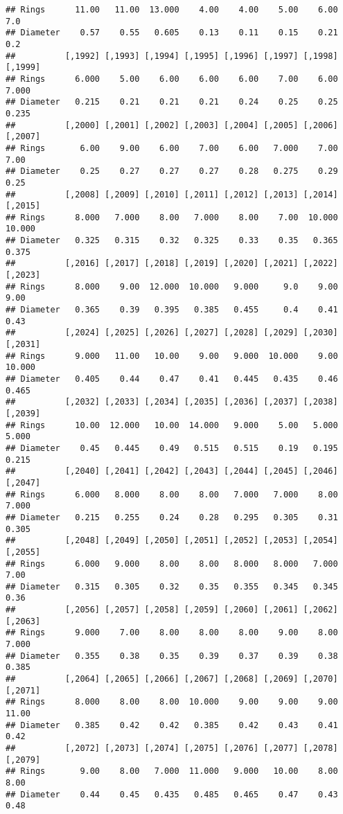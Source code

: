 \documentclass[
]{article}
\begin{document}
\begin{verbatim}
## Rings      11.00   11.00  13.000    4.00    4.00    5.00    6.00     7.0
## Diameter    0.57    0.55   0.605    0.13    0.11    0.15    0.21     0.2
##          [,1992] [,1993] [,1994] [,1995] [,1996] [,1997] [,1998] [,1999]
## Rings      6.000    5.00    6.00    6.00    6.00    7.00    6.00   7.000
## Diameter   0.215    0.21    0.21    0.21    0.24    0.25    0.25   0.235
##          [,2000] [,2001] [,2002] [,2003] [,2004] [,2005] [,2006] [,2007]
## Rings       6.00    9.00    6.00    7.00    6.00   7.000    7.00    7.00
## Diameter    0.25    0.27    0.27    0.27    0.28   0.275    0.29    0.25
##          [,2008] [,2009] [,2010] [,2011] [,2012] [,2013] [,2014] [,2015]
## Rings      8.000   7.000    8.00   7.000    8.00    7.00  10.000  10.000
## Diameter   0.325   0.315    0.32   0.325    0.33    0.35   0.365   0.375
##          [,2016] [,2017] [,2018] [,2019] [,2020] [,2021] [,2022] [,2023]
## Rings      8.000    9.00  12.000  10.000   9.000     9.0    9.00    9.00
## Diameter   0.365    0.39   0.395   0.385   0.455     0.4    0.41    0.43
##          [,2024] [,2025] [,2026] [,2027] [,2028] [,2029] [,2030] [,2031]
## Rings      9.000   11.00   10.00    9.00   9.000  10.000    9.00  10.000
## Diameter   0.405    0.44    0.47    0.41   0.445   0.435    0.46   0.465
##          [,2032] [,2033] [,2034] [,2035] [,2036] [,2037] [,2038] [,2039]
## Rings      10.00  12.000   10.00  14.000   9.000    5.00   5.000   5.000
## Diameter    0.45   0.445    0.49   0.515   0.515    0.19   0.195   0.215
##          [,2040] [,2041] [,2042] [,2043] [,2044] [,2045] [,2046] [,2047]
## Rings      6.000   8.000    8.00    8.00   7.000   7.000    8.00   7.000
## Diameter   0.215   0.255    0.24    0.28   0.295   0.305    0.31   0.305
##          [,2048] [,2049] [,2050] [,2051] [,2052] [,2053] [,2054] [,2055]
## Rings      6.000   9.000    8.00    8.00   8.000   8.000   7.000    7.00
## Diameter   0.315   0.305    0.32    0.35   0.355   0.345   0.345    0.36
##          [,2056] [,2057] [,2058] [,2059] [,2060] [,2061] [,2062] [,2063]
## Rings      9.000    7.00    8.00    8.00    8.00    9.00    8.00   7.000
## Diameter   0.355    0.38    0.35    0.39    0.37    0.39    0.38   0.385
##          [,2064] [,2065] [,2066] [,2067] [,2068] [,2069] [,2070] [,2071]
## Rings      8.000    8.00    8.00  10.000    9.00    9.00    9.00   11.00
## Diameter   0.385    0.42    0.42   0.385    0.42    0.43    0.41    0.42
##          [,2072] [,2073] [,2074] [,2075] [,2076] [,2077] [,2078] [,2079]
## Rings       9.00    8.00   7.000  11.000   9.000   10.00    8.00    8.00
## Diameter    0.44    0.45   0.435   0.485   0.465    0.47    0.43    0.48

\end{verbatim}
\end{document}
